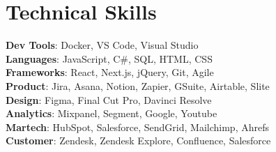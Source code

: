 \section{Technical Skills}
\begin{itemize}[leftmargin=0.15in, label={}]
    \small{
      \item{
      \textbf{Dev Tools}{: Docker, VS Code, Visual Studio} \\
      \textbf{Languages}{: JavaScript, C\#, SQL, HTML, CSS} \\
      \textbf{Frameworks}{: React, Next.js, jQuery, Git, Agile} \\
      \textbf{Product}{: Jira, Asana, Notion, Zapier, GSuite, Airtable, Slite} \\
      \textbf{Design}{: Figma, Final Cut Pro, Davinci Resolve} \\
      \textbf{Analytics}{: Mixpanel, Segment, Google, Youtube} \\
      \textbf{Martech}{: HubSpot, Salesforce, SendGrid, Mailchimp, Ahrefs } \\
      \textbf{Customer}{: Zendesk, Zendesk Explore, Confluence, Salesforce} \\
      }
    }
  \end{itemize}